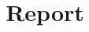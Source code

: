 \documentclass[]{article}
\title{Report}
\author{}
\begin{document}
\maketitle

\begin{abstract}

\end{abstract}

\section{}
\end{document}
